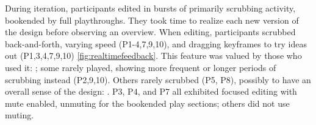 During iteration, participants edited in bursts of primarily scrubbing activity, bookended by full playthroughs.
They took time to realize each new version of the design before observing an overview.
   		When editing, participants scrubbed back-and-forth, varying speed (P1-4,7,9,10), and dragging keyframes to try ideas out (P1,3,4,7,9,10) \autoref{fig:realtimefeedback}.
    This feature was valued by those who used it: ;
    some rarely played, showing more frequent or longer periods of scrubbing instead (P2,9,10).
    Others rarely scrubbed (P5, P8), possibly to have an overall sense of the design: .
            	P3, P4, and P7 all exhibited focused editing with mute enabled, unmuting for the bookended play sections; others did not use muting.



